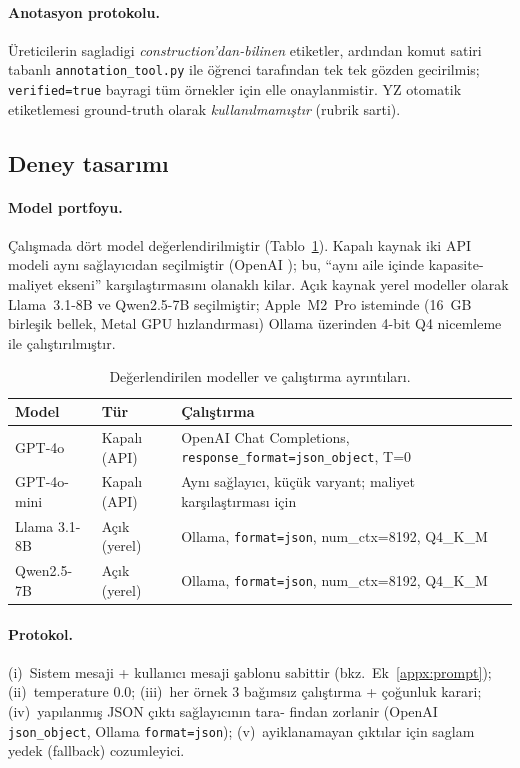 \documentclass[11pt,a4paper]{article}
\begin{document}
\paragraph{Anotasyon protokolu.} Üreticilerin sagladigi
\emph{construction'dan-bilinen} etiketler, ardından komut satiri tabanlı
\texttt{annotation\_tool.py} ile öğrenci tarafından tek tek gözden gecirilmis;
\texttt{verified=true} bayragi tüm örnekler için elle onaylanmistir. YZ
otomatik etiketlemesi ground-truth olarak \emph{kullanılmamıştır} (rubrik
sarti).

\subsection{Deney tasarımı}
\label{sub:deney}
\paragraph{Model portfoyu.} Çalışmada dört model değerlendirilmiştir
(Tablo~\ref{tab:models}). Kapalı kaynak iki API modeli aynı sağlayıcıdan
seçilmiştir (OpenAI \cite{openai2023gpt4}); bu, ``aynı aile içinde
kapasite-maliyet ekseni'' karşılaştırmasını olanaklı kilar. Açık kaynak yerel
modeller olarak Llama~3.1-8B \cite{touvron2023llama2} ve Qwen2.5-7B
\cite{qwen25} seçilmiştir; Apple~M2~Pro isteminde (16~GB birleşik bellek,
Metal GPU hızlandırması) Ollama üzerinden 4-bit Q4 nicemleme ile
çalıştırılmıştır.

\begin{table}[t]
\caption{Değerlendirilen modeller ve çalıştırma ayrıntıları.}
\label{tab:models}\small
\begin{tabularx}{\columnwidth}{l l X}
\toprule
\textbf{Model} & \textbf{Tür} & \textbf{Çalıştırma} \\
\midrule
GPT-4o            & Kapalı (API) & OpenAI Chat Completions, \texttt{response\_format=json\_object}, T=0 \\
GPT-4o-mini       & Kapalı (API) & Aynı sağlayıcı, küçük varyant; maliyet karşılaştırması için \\
Llama 3.1-8B      & Açık (yerel) & Ollama, \texttt{format=json}, num\_ctx=8192, Q4\_K\_M \\
Qwen2.5-7B        & Açık (yerel) & Ollama, \texttt{format=json}, num\_ctx=8192, Q4\_K\_M \\
\bottomrule
\end{tabularx}
\end{table}

\paragraph{Protokol.} (i)~Sistem mesaji + kullanıcı mesaji şablonu sabittir
(bkz.~Ek~\ref{appx:prompt}); (ii)~temperature 0.0; (iii)~her örnek 3 bağımsız
çalıştırma + çoğunluk karari; (iv)~yapılanmış JSON çıktı sağlayıcının tara-
findan zorlanir (OpenAI \texttt{json\_object}, Ollama \texttt{format=json});
(v)~ayiklanamayan çıktılar için saglam yedek (fallback) cozumleyici.
\end{document}
